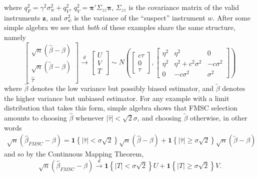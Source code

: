 \documentclass[12pt,letterpaper]{article}
\begin{document}
where $q^2_{F} = \gamma^2 \sigma_w^2 + q^2_{V}$, $q^2_{V} = \boldsymbol{\pi}'\Sigma_{zz}\boldsymbol{\pi}$, $\Sigma_{zz}$ is the covariance matrix of the valid instruments $\mathbf{z}$, and $\sigma_w^2$ is the variance of the ``suspect'' instrument $w$.
After some simple algebra we see that \emph{both} of these examples share the same structure, namely
\begin{equation}
  \left[ 
  \begin{array}{c}
    \sqrt{n} \left( \widehat{\beta} - \beta \right)\\
    \sqrt{n} \left( \widetilde{\beta} - \beta \right)\\
    \widehat{\tau}
\end{array}
\right] \overset{d}{\rightarrow} 
\left[
\begin{array}{c}
  U \\ V \\ T
\end{array}
\right] \sim
N\left( \left[
\begin{array}{c}
  c\tau\\ 0 \\ \tau
\end{array}
\right], 
\left[
\begin{array}{ccc}
  \eta^2 & \eta^2 & 0\\
  \eta^2 & \eta^2 + c^2 \sigma^2 & -c\sigma^2\\ 
  0 & -c\sigma^2 & \sigma^2 
\end{array}
\right]\right)
\label{eq:LimitExperiment}
\end{equation}
where $\widehat{\beta}$ denotes the low variance but possibly biased estimator, and $\widetilde{\beta}$ denotes the higher variance but unbiased estimator.
For any example with a limit distribution that takes this form, simple algebra shows that FMSC selection amounts to choosing $\widehat{\beta}$ whenever $|\widehat{\tau}|<\sqrt{2}\sigma$, and choosing $\widetilde{\beta}$ otherwise, in other words
\begin{eqnarray*}
  \sqrt{n}(\widehat{\beta}_{FMSC} - \beta) = \mathbf{1}\left\{ |\widehat{\tau}|<\sigma \sqrt{2} \right\} \sqrt{n}(\widehat{\beta} - \beta) +  \mathbf{1}\left\{ |\widehat{\tau}|\geq\sigma \sqrt{2} \right\}\sqrt{n}(\widetilde{\beta} - \beta)
\end{eqnarray*}
and so by the Continuous Mapping Theorem,
\begin{equation}
  \sqrt{n}(\widehat{\beta}_{FMSC} - \beta) \overset{d}{\rightarrow}  \mathbf{1}\left\{ |T|<\sigma \sqrt{2} \right\} U +  \mathbf{1}\left\{ |T|\geq\sigma \sqrt{2} \right\} V.
  \label{eq:FMSCLimitExperiment}
\end{equation}
\end{document}
